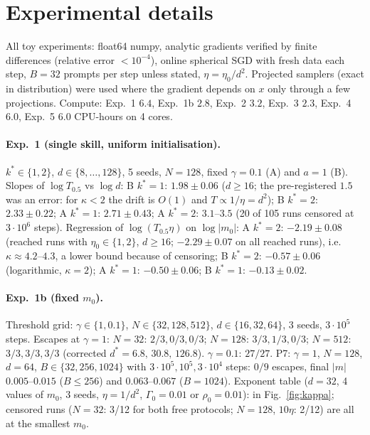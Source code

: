\section{Experimental details}
\label{app:exp}
All toy experiments: float64 numpy, analytic gradients verified by finite differences (relative error $<10^{-4}$), online spherical
SGD with fresh data each step, $B=32$ prompts per step unless stated, $\eta=\eta_0/d^2$. Projected samplers (exact in distribution)
were used where the gradient depends on $x$ only through a few projections. Compute: Exp.~1 $6.4$, Exp.~1b $2.8$, Exp.~2 $3.2$,
Exp.~3 $2.3$, Exp.~4 $6.0$, Exp.~5 $6.0$ CPU-hours on 4 cores.

\paragraph{Exp.~1 (single skill, uniform initialisation).} $k^*\in\{1,2\}$, $d\in\{8,\dots,128\}$, 5 seeds, $N=128$, fixed $\gamma=0.1$ (A) and
$a=1$ (B). Slopes of $\log T_{0.5}$ vs $\log d$: B $k^*=1$: $1.98\pm0.06$ ($d\ge16$; the pre-registered $1.5$ was an error: for $\kappa<2$ the drift
is $O(1)$ and $T\propto1/\eta=d^2$); B $k^*=2$: $2.33\pm0.22$; A $k^*=1$: $2.71\pm0.43$; A $k^*=2$: $3.1$--$3.5$ (20 of 105 runs censored at
$3\cdot10^6$ steps). Regression of $\log(T_{0.5}\eta)$ on $\log|m_0|$: A $k^*=2$: $-2.19\pm0.08$ (reached runs with $\eta_0\in\{1,2\}$, $d\ge16$; $-2.29\pm0.07$ on all
reached runs), i.e.\ $\kappa\approx4.2$--$4.3$, a lower bound because of censoring; B $k^*=2$: $-0.57\pm0.06$ (logarithmic, $\kappa=2$); A $k^*=1$: $-0.50\pm0.06$; B $k^*=1$: $-0.13\pm0.02$.

\paragraph{Exp.~1b (fixed $m_0$).} Threshold grid: $\gamma\in\{1,0.1\}$, $N\in\{32,128,512\}$, $d\in\{16,32,64\}$, 3 seeds, $3\cdot10^5$ steps.
Escapes at $\gamma=1$: $N=32$: $2/3,0/3,0/3$; $N=128$: $3/3,1/3,0/3$; $N=512$: $3/3,3/3,3/3$ (corrected $d^*=6.8,\,30.8,\,126.8$).
$\gamma=0.1$: $27/27$. P7: $\gamma=1$, $N=128$, $d=64$, $B\in\{32,256,1024\}$ with $3\cdot10^5,10^5,3\cdot10^4$ steps: $0/9$ escapes, final
$|m|$ $0.005$--$0.015$ ($B\le256$) and $0.063$--$0.067$ ($B=1024$). Exponent table ($d=32$, 4 values of $m_0$, 3 seeds, $\eta=1/d^2$,
$\Gamma_0=0.01$ or $\rho_0=0.01$): in Fig.~\ref{fig:kappa}; censored runs ($N=32$: 3/12 for both free protocols; $N=128$, $10\eta$: 2/12) are
all at the smallest $m_0$.

